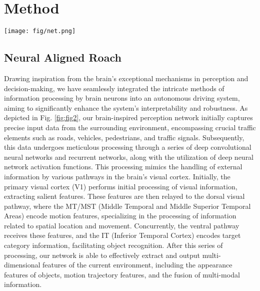 \section{Method}
\begin{figure*}[t]
	\centering
	\texttt{[image: fig/net.png]}
	\caption{Network architecture of Roach and the BID agent.
	}
	\label{fig:fig2}
\end{figure*}
\subsection{Neural Aligned Roach}
\hspace{1pc}Drawing inspiration from the brain's exceptional mechanisms in perception and decision-making, we have seamlessly integrated the intricate methods of information processing by brain neurons into an autonomous driving system, aiming to significantly enhance the system's interpretability and robustness. As depicted in Fig. \ref{fig:fig2}, our brain-inspired perception network initially captures precise input data from the surrounding environment, encompassing crucial traffic elements such as roads, vehicles, pedestrians, and traffic signals. Subsequently, this data undergoes meticulous processing through a series of deep convolutional neural networks and recurrent networks, along with the utilization of deep neural network activation functions. This processing mimics the handling of external information by various pathways in the brain's visual cortex. Initially, the primary visual cortex (V1) performs initial processing of visual information, extracting salient features. These features are then relayed to the dorsal visual pathway, where the MT/MST (Middle Temporal and Middle Superior Temporal Areas) encode motion features, specializing in the processing of information related to spatial location and movement. Concurrently, the ventral pathway receives these features, and the IT (Inferior Temporal Cortex) encodes target category information, facilitating object recognition. After this series of processing, our network is able to effectively extract and output multi-dimensional features of the current environment, including the appearance features of objects, motion trajectory features, and the fusion of multi-modal information.

